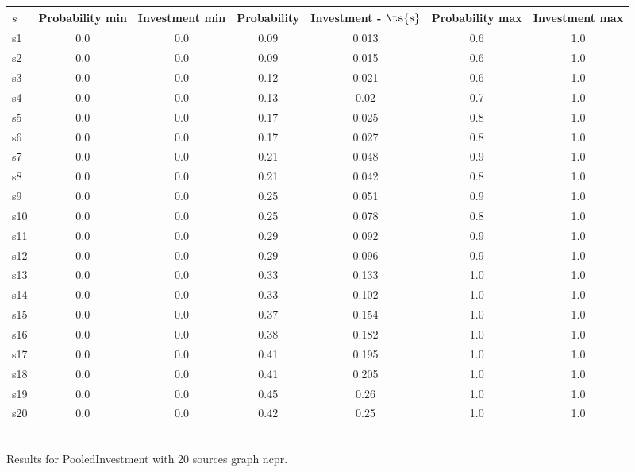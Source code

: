 \documentclass{article}
\begin{document}
\noindent\begin{tabular}{|l|c|c|c|c|c|c|}
\hline
$s$& Probability min & Investment min & Probability & Investment - $\ts{s}$ & Probability max & Investment max\\
\hline
s1 &0.0 & 0.0 & 0.09 & 0.013 & 0.6 & 1.0\\
\hline
s2 &0.0 & 0.0 & 0.09 & 0.015 & 0.6 & 1.0\\
\hline
s3 &0.0 & 0.0 & 0.12 & 0.021 & 0.6 & 1.0\\
\hline
s4 &0.0 & 0.0 & 0.13 & 0.02 & 0.7 & 1.0\\
\hline
s5 &0.0 & 0.0 & 0.17 & 0.025 & 0.8 & 1.0\\
\hline
s6 &0.0 & 0.0 & 0.17 & 0.027 & 0.8 & 1.0\\
\hline
s7 &0.0 & 0.0 & 0.21 & 0.048 & 0.9 & 1.0\\
\hline
s8 &0.0 & 0.0 & 0.21 & 0.042 & 0.8 & 1.0\\
\hline
s9 &0.0 & 0.0 & 0.25 & 0.051 & 0.9 & 1.0\\
\hline
s10 &0.0 & 0.0 & 0.25 & 0.078 & 0.8 & 1.0\\
\hline
s11 &0.0 & 0.0 & 0.29 & 0.092 & 0.9 & 1.0\\
\hline
s12 &0.0 & 0.0 & 0.29 & 0.096 & 0.9 & 1.0\\
\hline
s13 &0.0 & 0.0 & 0.33 & 0.133 & 1.0 & 1.0\\
\hline
s14 &0.0 & 0.0 & 0.33 & 0.102 & 1.0 & 1.0\\
\hline
s15 &0.0 & 0.0 & 0.37 & 0.154 & 1.0 & 1.0\\
\hline
s16 &0.0 & 0.0 & 0.38 & 0.182 & 1.0 & 1.0\\
\hline
s17 &0.0 & 0.0 & 0.41 & 0.195 & 1.0 & 1.0\\
\hline
s18 &0.0 & 0.0 & 0.41 & 0.205 & 1.0 & 1.0\\
\hline
s19 &0.0 & 0.0 & 0.45 & 0.26 & 1.0 & 1.0\\
\hline
s20 &0.0 & 0.0 & 0.42 & 0.25 & 1.0 & 1.0\\
\hline
\end{tabular}\\

\noindent Results for PooledInvestment with 20 sources graph ncpr.
\end{document}
